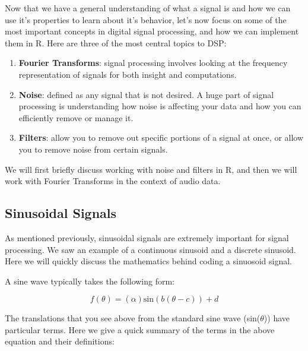 \documentclass[]{krantz}
\providecommand{\tightlist}{%
  \setlength{\itemsep}{0pt}\setlength{\parskip}{0pt}}
\begin{document}
Now that we have a general understanding of what a signal is and how we
can use it's properties to learn about it's behavior, let's now focus on
some of the most important concepts in digital signal processing, and
how we can implement them in R. Here are three of the most central
topics to DSP:

\begin{enumerate}
\def\labelenumi{\arabic{enumi}.}
\tightlist
\item
  \textbf{Fourier Transforms}: signal processing involves looking at the
  frequency representation of signals for both insight and computations.
\item
  \textbf{Noise}: defined as any signal that is not desired. A huge part
  of signal processing is understanding how noise is affecting your data
  and how you can efficiently remove or manage it.
\item
  \textbf{Filters}: allow you to remove out specific portions of a
  signal at once, or allow you to remove noise from certain signals.
\end{enumerate}

We will first briefly discuss working with noise and filters in R, and
then we will work with Fourier Transforms in the context of audio data.

\subsection{Sinusoidal Signals}\label{sinusoidal-signals}

As mentioned previously, sinusoidal signals are extremely important for
signal processing. We saw an example of a continuous sinusoid and a
discrete sinusoid. Here we will quickly discuss the mathematics behind
coding a sinuosoid signal.

A sine wave typically takes the following form:

\[
f(\theta) = (\alpha) \text{sin}(b(\theta - c)) + d
\]

The translations that you see above from the standard sine wave
(sin(\(\theta\))) have particular terms. Here we give a quick summary of
the terms in the above equation and their definitions:
\end{document}
